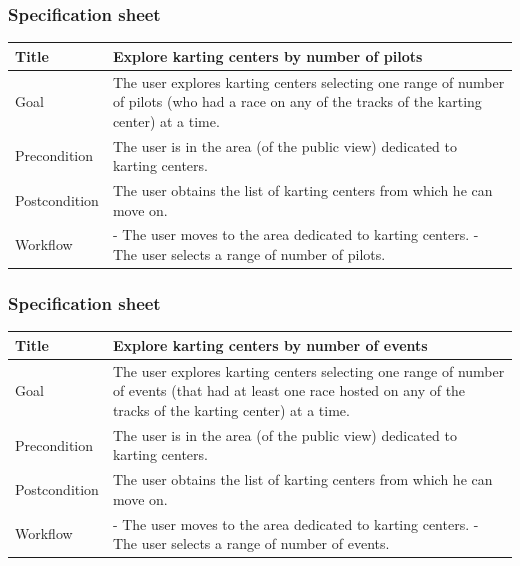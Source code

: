\documentclass{beamer}
\begin{document}
\begin{frame}
    \frametitle{Specification sheet}
    \begin{table}
        \tiny
        \begin{tabular}{|p{2cm}|p{6cm}|}
        \hline
        Title & \textbf{Explore karting centers by number of pilots} \\
        \hline
        Goal & The user explores karting centers selecting one range of number of pilots (who had a race on 
        any of the tracks of the karting center) at a time. \\
        \hline
        Precondition & The user is in the area (of the public view) dedicated to karting centers.\\
        \hline
        Postcondition & The user obtains the list of karting centers from which he can move on.\\
        \hline
        Workflow &
        - The user moves to the area dedicated to karting centers. \newline
        - The user selects a range of number of pilots. \\
        \hline
        \end{tabular}
\end{table}
\end{frame}

\begin{frame}
    \frametitle{Specification sheet}
    \begin{table}
        \tiny
        \begin{tabular}{|p{2cm}|p{6cm}|}
        \hline
        Title & \textbf{Explore karting centers by number of events} \\
        \hline
        Goal & The user explores karting centers selecting one range of number of events (that had
        at least one race hosted on 
        any of the tracks of the karting center) at a time. \\
        \hline
        Precondition & The user is in the area (of the public view) dedicated to karting centers.\\
        \hline
        Postcondition & The user obtains the list of karting centers from which he can move on.\\
        \hline
        Workflow &
        - The user moves to the area dedicated to karting centers. \newline
        - The user selects a range of number of events. \\
        \hline
        \end{tabular}
\end{table}
\end{frame}
\end{document}
